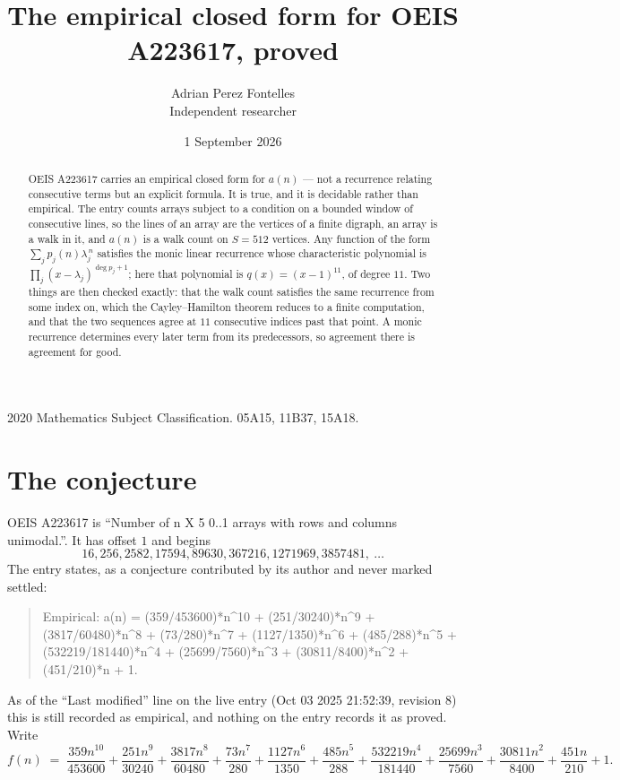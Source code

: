 \documentclass[11pt,a4paper]{article}
\title{The empirical closed form for OEIS A223617, proved}
\author{Adrian Perez Fontelles\\ \small Independent researcher}
\date{1 September 2026}
\theoremstyle{plain}
\theoremstyle{definition}
\begin{document}
\maketitle

\begin{abstract}
OEIS A223617 carries an empirical closed form for $a(n)$ --- not a recurrence relating
consecutive terms but an explicit formula. It is true, and it is decidable rather than
empirical. The entry counts arrays subject to a condition on a bounded window of consecutive lines, so the lines of an array are the
vertices of a finite digraph, an array is a walk in it, and $a(n)$ is a walk count on
$S=512$ vertices. Any function of the form $\sum_j p_j(n)\lambda_j^{\,n}$ satisfies the
monic linear recurrence whose characteristic polynomial is
$\prod_j(x-\lambda_j)^{\deg p_j+1}$; here that polynomial is $q(x)=(x-1)^{11}$, of degree
$11$. Two things are then checked exactly: that the walk count satisfies the same
recurrence from some index on, which the Cayley--Hamilton theorem reduces to a finite
computation, and that the two sequences agree at $11$ consecutive indices past that
point. A monic recurrence determines every later term from its predecessors, so agreement
there is agreement for good.
\end{abstract}

\noindent\small 2020 Mathematics Subject Classification. 05A15, 11B37, 15A18.\normalsize

\section{The conjecture}

OEIS A223617 is ``Number of n X 5 0..1 arrays with rows and columns unimodal.''. It has offset $1$ and begins
\[
16, 256, 2582, 17594, 89630, 367216, 1271969, 3857481,\ \dots
\]
The entry states, as a conjecture contributed by its author and never marked settled:
\begin{quote}
Empirical: a(n) = (359/453600)*n\^{}10 + (251/30240)*n\^{}9 + (3817/60480)*n\^{}8 + (73/280)*n\^{}7 + (1127/1350)*n\^{}6 + (485/288)*n\^{}5 + (532219/181440)*n\^{}4 + (25699/7560)*n\^{}3 + (30811/8400)*n\^{}2 + (451/210)*n + 1.
\end{quote}
As of the ``Last modified'' line on the live entry (Oct 03 2025 21:52:39, revision 8) this is still
recorded as empirical, and nothing on the entry records it as proved. Write
\[
f(n)\;=\;\frac{359 n^{10}}{453600} + \frac{251 n^{9}}{30240} + \frac{3817 n^{8}}{60480} + \frac{73 n^{7}}{280} + \frac{1127 n^{6}}{1350} + \frac{485 n^{5}}{288} + \frac{532219 n^{4}}{181440} + \frac{25699 n^{3}}{7560} + \frac{30811 n^{2}}{8400} + \frac{451 n}{210} + 1.
\]
\end{document}
